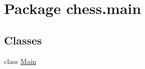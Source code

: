 \hypertarget{namespacechess_1_1main}{}\section{Package chess.\+main}
\label{namespacechess_1_1main}
\subsection*{Classes}
\begin{DoxyCompactItemize}
\item 
class \mbox{\hyperlink{classchess_1_1main_1_1_main}{Main}}
\end{DoxyCompactItemize}
